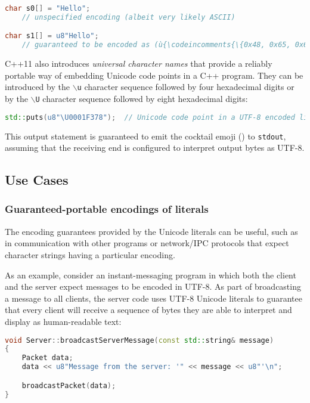 \begin{lstlisting}[language=C++]
char s0[] = "Hello";
    // unspecified encoding (albeit very likely ASCII)

char s1[] = u8"Hello";
    // guaranteed to be encoded as (ù{\codeincomments{\{0x48, 0x65, 0x6C, 0x6C, 0x6F, 0x0\}}}ù)
\end{lstlisting}

\noindent C++11 also introduces \emph{universal character names} that provide a
reliably portable way of embedding Unicode code points in a C++ program.
They can be introduced by the \texttt{$\backslash$u} character
sequence followed by four hexadecimal digits or by the
\texttt{$\backslash$U} character sequence followed by eight
hexadecimal digits:

\begin{lstlisting}[language=C++]
std::puts(u8"\U0001F378");  // Unicode code point in a UTF-8 encoded literal
\end{lstlisting}

\noindent This output statement is guaranteed to emit the cocktail emoji
(\martini) to \texttt{stdout}, assuming that the receiving end is configured to
interpret output bytes as UTF-8.

\subsection[Use Cases]{Use Cases}\label{use-cases}

\subsubsection[Guaranteed-portable encodings of literals]{Guaranteed-portable encodings of literals}\label{guaranteed-portable-encodings-of-literals}

The encoding guarantees provided by the Unicode literals can be useful,
such as in communication with other programs or network/IPC protocols that
expect character strings having a particular encoding.

As an example, consider an instant-messaging program in which both the
client and the server expect messages to be encoded in UTF-8. As part of
broadcasting a message to all clients, the server code uses UTF-8
Unicode literals to guarantee that every client will receive a sequence
of bytes they are able to interpret and display as human-readable text:

\begin{lstlisting}[language=C++]
void Server::broadcastServerMessage(const std::string& message)
{
    Packet data;
    data << u8"Message from the server: '" << message << u8"'\n";

    broadcastPacket(data);
}
\end{lstlisting}


